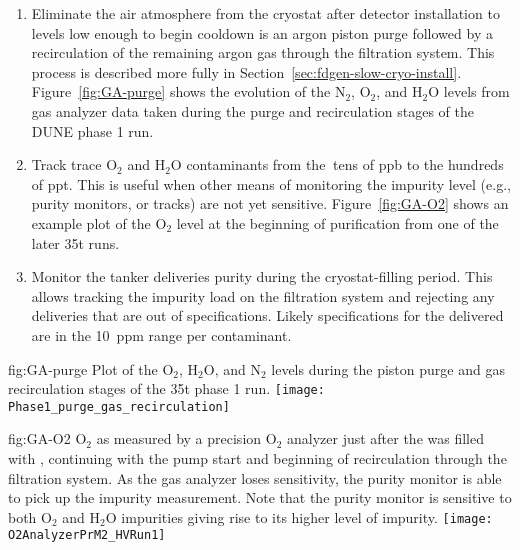 \begin{enumerate}
\item Eliminate the air atmosphere from the cryostat after detector installation to levels low enough to begin cooldown is an argon piston purge followed by a recirculation of the remaining argon gas through the filtration system. This process is described more fully in Section~\ref{sec:fdgen-slow-cryo-install}. Figure~\ref{fig:GA-purge} shows the evolution of the $\text{N}_2$, $\text{O}_2$, and $\text{H}_2\text{O}$ levels from gas analyzer data taken during the purge and recirculation stages of the DUNE  %
phase 1 run.

\item Track trace $\text{O}_2$ and $\text{H}_2\text{O}$ contaminants from the $\>$tens of ppb to the hundreds of ppt. This is useful when other means of monitoring the impurity level (e.g., purity monitors, or  tracks) are not yet sensitive. Figure~\ref{fig:GA-O2} shows an example plot of the $\text{O}_2$ level at the beginning of  purification from one of the later \num{35}\si{t} %
 runs.

\item Monitor the tanker  deliveries purity during the cryostat-filling period. This allows tracking the impurity load on the filtration system and rejecting any deliveries that are out of specifications. Likely specifications for the delivered  are in the \SI{10}{ppm} range per contaminant.

\end{enumerate}

\begin{dunefigure}{fig:GA-purge}
  {Plot of the $\text{O}_2$, $\text{H}_2\text{O}$, and $\text{N}_2$ levels during the piston purge and gas recirculation stages of the \num{35}\si{t} %
  phase 1 run.}
  \texttt{[image: Phase1\_purge\_gas\_recirculation]}%
\end{dunefigure}

\begin{dunefigure}{fig:GA-O2}
  {$\text{O}_2$ as measured by a precision $\text{O}_2$ analyzer just after the  %
  was filled with , continuing with the  pump start and beginning of  recirculation through the filtration system. As the gas analyzer loses sensitivity, the purity monitor is able to pick up the impurity measurement. Note that the purity monitor is sensitive to both $\text{O}_2$ and $\text{H}_2\text{O}$ impurities giving rise to its higher level of impurity.}
  \texttt{[image: O2AnalyzerPrM2\_HVRun1]}%
\end{dunefigure}

